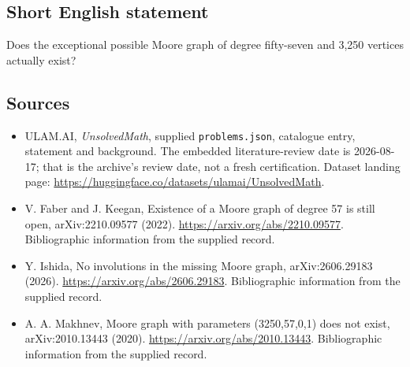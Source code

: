 \documentclass[11pt,a4paper]{article}
\begin{document}
\subsection{Short English statement}

Does the exceptional possible Moore graph of degree fifty-seven and 3,250 vertices actually exist?

\subsection{Sources}

{\small

\begin{itemize}

\item[\hypertarget{source:statement:1}{S1}] ULAM.AI, \emph{UnsolvedMath}, supplied \texttt{problems.json}, catalogue entry, statement and background. The embedded literature-review date is 2026-08-17; that is the archive’s review date, not a fresh certification. Dataset landing page: \url{https://huggingface.co/datasets/ulamai/UnsolvedMath}.

\item[\hypertarget{source:statement:2}{S2}] V. Faber and J. Keegan, Existence of a Moore graph of degree 57 is still open, arXiv:2210.09577 (2022). \url{https://arxiv.org/abs/2210.09577}. Bibliographic information from the supplied record.

\item[\hypertarget{source:statement:3}{S3}] Y. Ishida, No involutions in the missing Moore graph, arXiv:2606.29183 (2026). \url{https://arxiv.org/abs/2606.29183}. Bibliographic information from the supplied record.

\item[\hypertarget{source:statement:4}{S4}] A. A. Makhnev, Moore graph with parameters (3250,57,0,1) does not exist, arXiv:2010.13443 (2020). \url{https://arxiv.org/abs/2010.13443}. Bibliographic information from the supplied record.

\end{itemize}

}

\label{end:statement}
\end{document}
